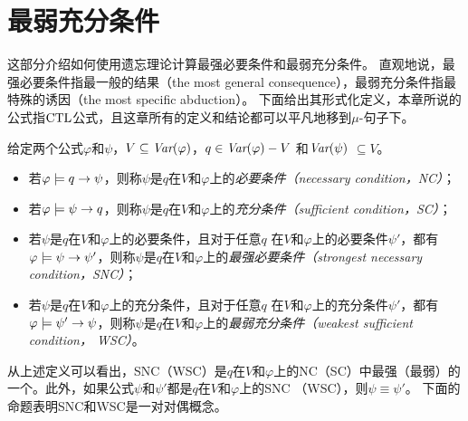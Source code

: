 \section{最弱充分条件}
\label{chapter04:sec:snc}
这部分介绍如何使用遗忘理论计算最强必要条件和最弱充分条件。
直观地说，最强必要条件指最一般的结果（the most general consequence），最弱充分条件指最特殊的诱因（the most specific abduction）。
下面给出其形式化定义，本章所说的公式指$\textrm{CTL}$公式，且这章所有的定义和结论都可以平凡地移到$\mu$-句子下。
\begin{definition}[充分和必要条件]\label{def:NC:SC}
	给定两个公式$\varphi$和$\psi$，$V \subseteq \textit{Var}(\varphi)$，$q\in\textit{Var}(\varphi)- V$
	和$\textit{Var}(\psi)$ $\subseteq V$。
	\begin{itemize}
		\item 若$\varphi \models q \rightarrow \psi$，则称$\psi$是$q$在$V$和$\varphi$上的{\em 必要条件（necessary condition，NC）}；
		\item 若$\varphi \models \psi\rightarrow q$，则称$\psi$是$q$在$V$和$\varphi$上的{\em 充分条件（sufficient condition，SC）}；
		\item 若$\psi$是$q$在$V$和$\varphi$上的必要条件，且对于任意$q$ 在$V$和$\varphi$上的必要条件$\psi'$，都有$\varphi\models\psi\rightarrow\psi'$，则称$\psi$是$q$在$V$和$\varphi$上的{\em 最强必要条件（strongest necessary condition，SNC）}；
		\item 若$\psi$是$q$在$V$和$\varphi$上的充分条件，且对于任意$q$ 在$V$和$\varphi$上的充分条件$\psi'$，都有$\varphi\models\psi'\rightarrow\psi$，则称$\psi$是$q$在$V$和$\varphi$上的{\em 最弱充分条件（weakest sufficient condition， WSC）}。
	\end{itemize}
\end{definition}

从上述定义可以看出，SNC（WSC）是$q$在$V$和$\varphi$上的NC（SC）中最强（最弱）的一个。此外，如果公式$\psi$和$\psi'$都是$q$在$V$和$\varphi$上的SNC （WSC），则$\psi \equiv \psi'$。
下面的命题表明SNC和WSC是一对对偶概念。

